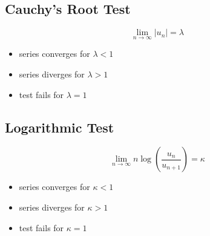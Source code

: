\documentclass[../main.tex]{subfiles}
\begin{document}
	\subsection{Cauchy's Root Test}
	\begin{equation}
		\lim_{n\to\infty} \lvert u_n \rvert=\lambda
	\end{equation}
	\begin{itemize}
		\item series converges for $\lambda<1$
		\item series diverges for $\lambda>1$
		\item test fails for $\lambda=1$
	\end{itemize}
	
	\subsection{Logarithmic Test}
	\begin{equation}
		\lim_{n\to\infty} n \log \left( \dfrac{u_n}{u_{n+1}} \right) = \kappa
	\end{equation}
	\begin{itemize}
		\item series converges for $\kappa<1$
		\item series diverges for $\kappa>1$
		\item test fails for $\kappa=1$
	\end{itemize}
\end{document}
